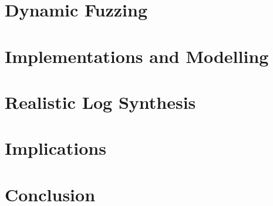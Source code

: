 \documentclass[12pt,draft]{article}
\begin{document}
\section{Dynamic Fuzzing}\label{sec:dynamic-fuzzing}


\section{Implementations and Modelling}\label{sec:implementations-and-modelling}



\section{Realistic Log Synthesis}\label{sec:evaluation}



\section{Implications}\label{sec:implications}




\section{Conclusion}\label{sec:conclusion}
\end{document}
